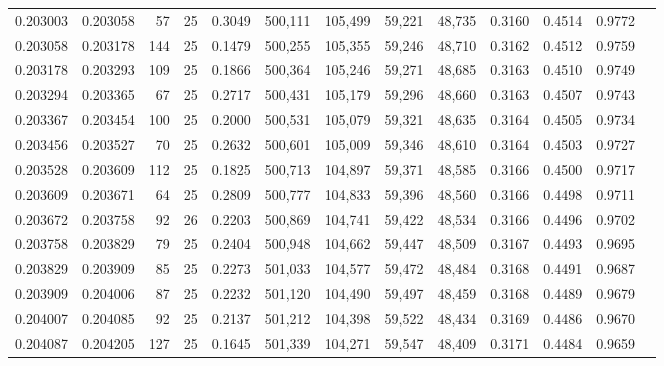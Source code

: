 \begin{tabular}{rrrrrrrrrrrrr}
0.203003 & 0.203058 &    57 &  25 &                                     0.3049 & 500,111 & 105,499 &  59,221 &  48,735 & 0.3160 & 0.4514 & 0.9772 \\
0.203058 & 0.203178 &   144 &  25 &                                     0.1479 & 500,255 & 105,355 &  59,246 &  48,710 & 0.3162 & 0.4512 & 0.9759 \\
0.203178 & 0.203293 &   109 &  25 &                                     0.1866 & 500,364 & 105,246 &  59,271 &  48,685 & 0.3163 & 0.4510 & 0.9749 \\
0.203294 & 0.203365 &    67 &  25 &                                     0.2717 & 500,431 & 105,179 &  59,296 &  48,660 & 0.3163 & 0.4507 & 0.9743 \\
0.203367 & 0.203454 &   100 &  25 &                                     0.2000 & 500,531 & 105,079 &  59,321 &  48,635 & 0.3164 & 0.4505 & 0.9734 \\
0.203456 & 0.203527 &    70 &  25 &                                     0.2632 & 500,601 & 105,009 &  59,346 &  48,610 & 0.3164 & 0.4503 & 0.9727 \\
0.203528 & 0.203609 &   112 &  25 &                                     0.1825 & 500,713 & 104,897 &  59,371 &  48,585 & 0.3166 & 0.4500 & 0.9717 \\
0.203609 & 0.203671 &    64 &  25 &                                     0.2809 & 500,777 & 104,833 &  59,396 &  48,560 & 0.3166 & 0.4498 & 0.9711 \\
0.203672 & 0.203758 &    92 &  26 &                                     0.2203 & 500,869 & 104,741 &  59,422 &  48,534 & 0.3166 & 0.4496 & 0.9702 \\
0.203758 & 0.203829 &    79 &  25 &                                     0.2404 & 500,948 & 104,662 &  59,447 &  48,509 & 0.3167 & 0.4493 & 0.9695 \\
0.203829 & 0.203909 &    85 &  25 &                                     0.2273 & 501,033 & 104,577 &  59,472 &  48,484 & 0.3168 & 0.4491 & 0.9687 \\
0.203909 & 0.204006 &    87 &  25 &                                     0.2232 & 501,120 & 104,490 &  59,497 &  48,459 & 0.3168 & 0.4489 & 0.9679 \\
0.204007 & 0.204085 &    92 &  25 &                                     0.2137 & 501,212 & 104,398 &  59,522 &  48,434 & 0.3169 & 0.4486 & 0.9670 \\
0.204087 & 0.204205 &   127 &  25 &                                     0.1645 & 501,339 & 104,271 &  59,547 &  48,409 & 0.3171 & 0.4484 & 0.9659 \\

\end{tabular}
